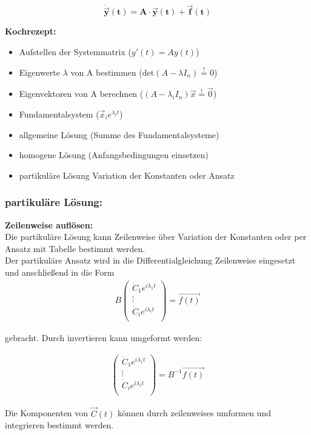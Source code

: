 
\[ \bm{\dot{\vec{y}}(t)=A\cdot\vec{y}(t) + \vec{f}(t)}\]


\textbf{Kochrezept:}\\
\begin{itemize}
    \item Aufstellen der Systemmatrix ($y'(t) = A y(t)$)
    \item Eigenwerte $\lambda$ von A bestimmen ($\text{det}(A-\lambda I_n)\stackrel{!}{=}0$)
    \item Eigenvektoren von A berechnen ($(A-\lambda_i I_n)\vec{x} \stackrel{!}{=}\vec{0}$)
    \item Fundamentalsystem ($\vec{x}_i e^{\lambda_i t}$)
    \item allgemeine Lösung (Summe des Fundamentalsysteme)
    \item homogene Lösung (Anfangsbedingungen einsetzen)
    \item partikuläre Lösung Variation der Konstanten oder Ansatz
\end{itemize}

\subsubsection{partikuläre Lösung:}
\textbf{Zeilenweise auflösen:}\\
Die partikuläre Lösung kann Zeilenweise über Variation der Konstanten oder per Ansatz mit Tabelle bestimmt werden.\\

Der partikuläre Ansatz wird in die Differentialgleichung Zeilenweise eingesetzt und anschließend in die Form
\begin{align*}
    B \begin{pmatrix}
        \dot{C}_1 e^{i\lambda_1 t}\\
        \vdots\\
        \dot{C}_ie^{i\lambda_i t}\\
    \end{pmatrix} = \vec{f(t)}  
\end{align*}

gebracht. Durch invertieren kann umgeformt werden:

\begin{align*}
    \begin{pmatrix}
        \dot{C}_1 e^{i\lambda_1 t}\\
        \vdots\\
        \dot{C}_ie^{i\lambda_i t}\\
    \end{pmatrix} =B^{-1} \vec{f(t)}  
\end{align*}

Die Komponenten von $\vec{C}(t)$ können durch zeilenweises umformen und integrieren bestimmt werden.